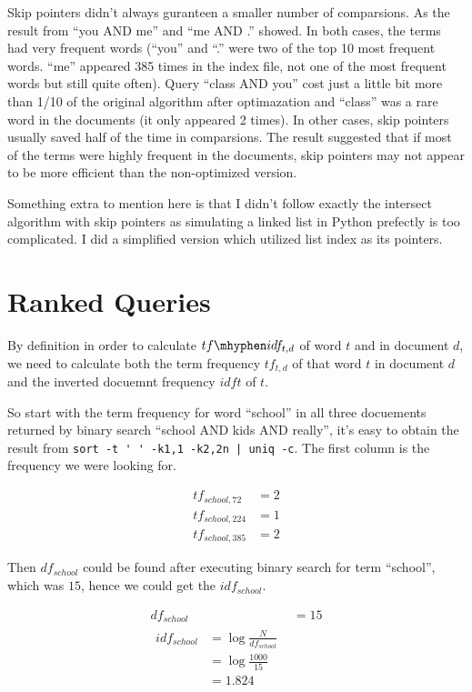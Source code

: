 \documentclass[11pt]{article} %
\begin{document}
Skip pointers didn't always guranteen a smaller number of comparsions. As the result from ``you AND me'' and ``me AND .'' showed. In both cases, the terms had very frequent words (``you'' and ``.'' were two of the top 10 most frequent words. ``me'' appeared 385 times in the index file, not one of the most frequent words but still quite often). Query ``class AND you'' cost just a little bit more than 1/10 of the original algorithm after optimazation and ``class'' was a rare word in the documents (it only appeared 2 times). In other cases, skip pointers usually saved half of the time in comparsions. The result suggested that if most of the terms were highly frequent in the documents, skip pointers may not appear to be more efficient than the non-optimized version.

Something extra to mention here is that I didn't follow exactly the intersect algorithm with skip pointers as simulating a linked list in Python prefectly is too complicated. I did a simplified version which utilized list index as its pointers.

\section{Ranked Queries}

By definition in order to calculate $tf\mhyphen idf_{t, d}$ of word $t$ and in document $d$, we need to calculate both the term frequency $tf_{t, d}$ of that word $t$ in document $d$ and the inverted docuemnt frequency $idf{t}$ of $t$.

So start with the term frequency for word ``school'' in all three docuements returned by binary search ``school AND kids AND really'', it's easy to obtain the result from \verb=sort -t ' ' -k1,1 -k2,2n | uniq -c=. The first column is the frequency we were looking for.

\begin{align*}
    tf_{school, 72} &= 2 \\
    tf_{school, 224} &= 1 \\
    tf_{school, 385} &= 2
\end{align*}

Then $df_{school}$ could be found after executing binary search for term ``school'', which was $15$, hence we could get the $idf_{school}$. 

\begin{align*}
    df_{school} &= 15 \\
    \begin{split}
        idf_{school} &= \log{\frac{N}{df_{school}}} \\
            &= \log{\frac{1000}{15}} \\
            &= 1.824
    \end{split}
\end{align*}
\end{document}
